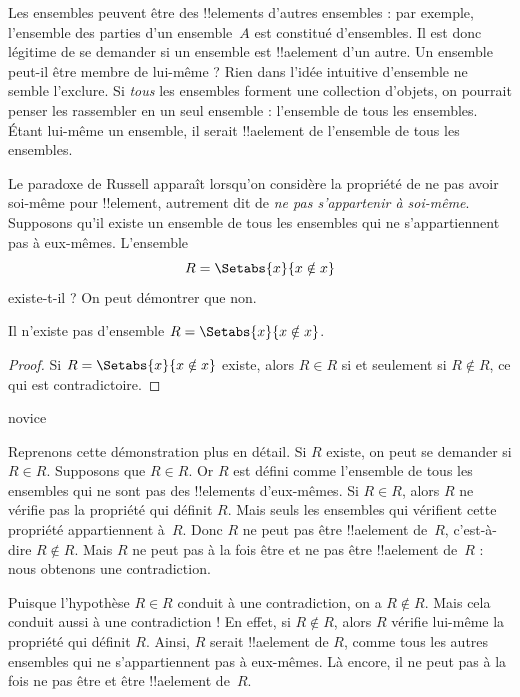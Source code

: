 \documentclass[11pt,a4paper,openany]{memoir}
\begin{document}
Les ensembles peuvent être des !!{element}s d'autres ensembles :
par exemple, l'ensemble des parties d'un ensemble~$A$ est
constitué d'ensembles. Il est donc légitime de se demander
si un ensemble est !!a{element} d'un autre.
Un ensemble peut-il être membre de lui-même ?
Rien dans l'idée intuitive d'ensemble ne semble l'exclure.
Si \emph{tous} les ensembles forment une collection d'objets,
on pourrait penser les rassembler en un seul ensemble :
l'ensemble de tous les ensembles. Étant lui-même un ensemble,
il serait !!a{element} de l'ensemble de tous les ensembles.

Le paradoxe de Russell apparaît lorsqu'on considère la propriété
de ne pas avoir soi-même pour !!{element}, autrement dit
de \emph{ne pas s'appartenir à soi-même}.
Supposons qu'il existe un ensemble de tous les ensembles
qui ne s'appartiennent pas à eux-mêmes. L'ensemble
\[
R = \Setabs{x}{x \notin x}
\]
existe-t-il ? On peut démontrer que non.

\begin{thm}
	Il n'existe pas d'ensemble $R = \Setabs{x}{x \notin x}$.
\end{thm}

\begin{proof}
Si $R = \Setabs{x}{x \notin x}$ existe, alors
$R \in R$ si et seulement si $R \notin R$,
ce qui est contradictoire.
\end{proof}

\begin{tagblock}{novice}
\begin{explain}
Reprenons cette démonstration plus en détail.
Si $R$ existe, on peut se demander si $R \in R$.
Supposons que $R \in R$. Or $R$ est défini comme
l'ensemble de tous les ensembles qui ne sont pas des
!!{element}s d'eux-mêmes. Si $R \in R$, alors $R$ ne vérifie
pas la propriété qui définit $R$. Mais seuls les ensembles
qui vérifient cette propriété appartiennent à~$R$.
Donc $R$ ne peut pas être !!a{element} de~$R$,
c'est-à-dire $R \notin R$. Mais $R$ ne peut pas à la fois
être et ne pas être !!a{element} de~$R$ :
nous obtenons une contradiction.

Puisque l'hypothèse $R \in R$ conduit à une contradiction,
on a $R \notin R$. Mais cela conduit aussi à une contradiction !{}
En effet, si $R \notin R$, alors $R$ vérifie lui-même
la propriété qui définit $R$. Ainsi, $R$ serait !!a{element} de $R$,
comme tous les autres ensembles qui ne s'appartiennent pas
à eux-mêmes. Là encore, il ne peut pas à la fois
ne pas être et être !!a{element} de~$R$.
\end{explain}
\end{tagblock}
\end{document}
